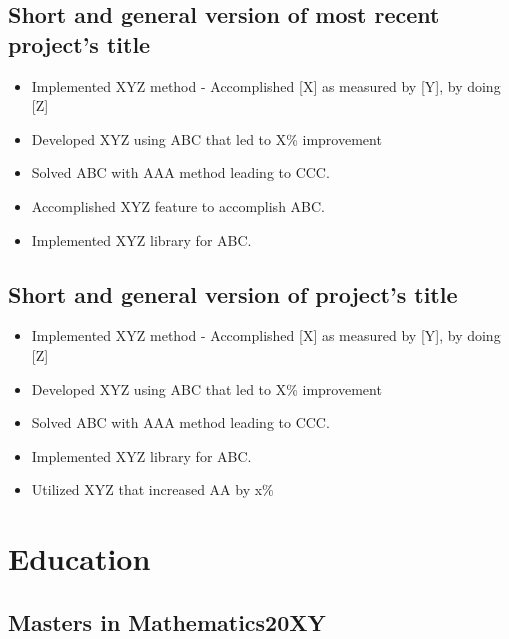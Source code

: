 \documentclass[11pt]{article}
\begin{document}
    \subsection{Short and general version of most recent project's title} %
    \begin{itemize}
        \item[\checkmark] Implemented XYZ method - Accomplished [X] as measured by [Y], by doing [Z] 
        \item[\checkmark] Developed XYZ using ABC that led to X\% improvement 
        \item[\checkmark] Solved ABC with AAA method leading to CCC.
        \item[\checkmark] Accomplished XYZ feature to accomplish ABC.
        \item[\checkmark] Implemented XYZ library for ABC.
    \end{itemize}
    \subsection{Short and general version of project's title} %
    \begin{itemize}
        \item[\checkmark] Implemented XYZ method - Accomplished [X] as measured by [Y], by doing [Z] 
        \item[\checkmark] Developed XYZ using ABC that led to X\% improvement 
        \item[\checkmark] Solved ABC with AAA method leading to CCC.
        \item[\checkmark] Implemented XYZ library for ABC.
        \item[\checkmark] Utilized XYZ that increased AA by x\%
    \end{itemize}

    \section{Education}
    \subsection{Masters in Mathematics\hfill \normalfont 20XY}  
    
\end{document}
